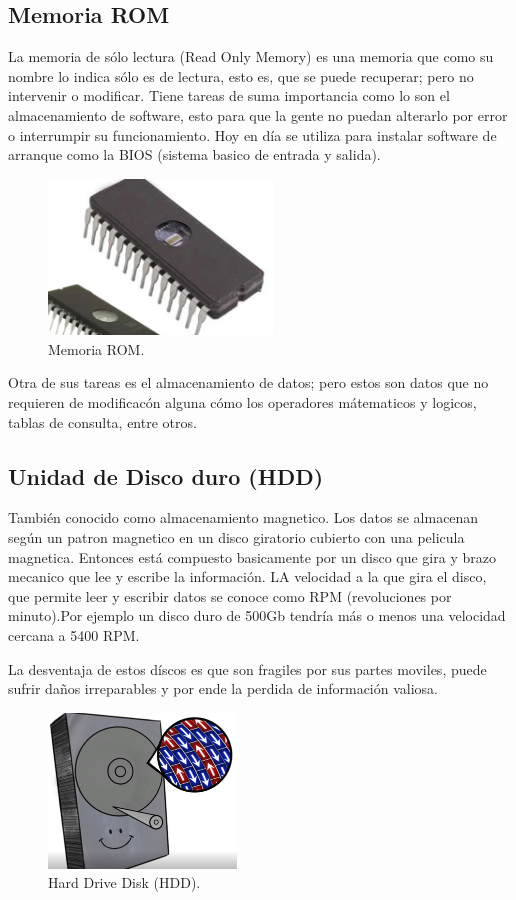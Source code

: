 \documentclass{article}
\begin{document}
\subsection{Memoria ROM}
La memoria de sólo lectura (Read Only Memory) es una memoria que como su nombre lo indica sólo es de lectura, esto es, que se puede recuperar; pero no intervenir o modificar.
Tiene tareas de suma importancia como lo son el almacenamiento de software, esto para que la gente no puedan alterarlo por error o interrumpir su funcionamiento. Hoy en día se utiliza para instalar software de arranque como la BIOS (sistema basico de entrada y salida).

\begin{figure}[h]
\includegraphics[width=6cm]{ROM.PNG}
\centering
\caption{Memoria ROM.}
\label{ROM.PNG}
\end{figure}

Otra de sus tareas es el almacenamiento de datos; pero estos son datos que no requieren de modificacón alguna cómo los operadores mátematicos y logicos, tablas de consulta, entre otros.
\subsection{Unidad de Disco duro (HDD)}
También conocido como almacenamiento magnetico. Los datos se almacenan según un patron magnetico en un disco giratorio cubierto con una pelicula magnetica\cite{TEDwebsite}. Entonces está compuesto basicamente por un disco que gira y brazo mecanico que lee y escribe la información. LA velocidad a la que gira el disco, que permite leer y escribir datos se conoce como RPM (revoluciones por minuto).Por ejemplo un disco duro de 500Gb tendría más o menos una velocidad cercana a 5400 RPM.

La desventaja de estos díscos es que son fragiles por sus partes moviles, puede sufrir daños irreparables y por ende la perdida de información valiosa.

\begin{figure}[h]
\includegraphics[width=5cm]{HDD.PNG}
\centering
\caption{Hard Drive Disk (HDD).\cite{TEDwebsite}}
\label{HDD.PNG}
\end{figure}
\end{document}
